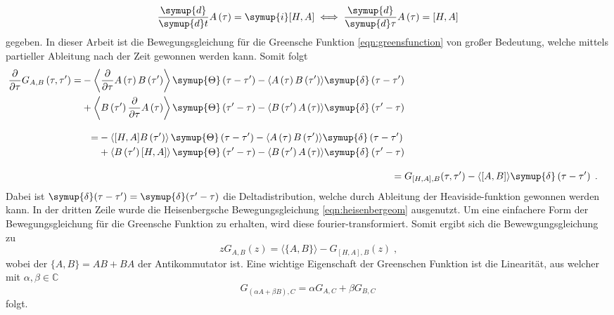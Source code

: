 \begin{equation}
\frac{\symup{d}}{\symup{d}t} A \left (\tau \right ) = \symup{i}  [H, A] \iff \frac{\symup{d}}{\symup{d}\tau} A \left (\tau \right ) = [H, A] \label{eqn:heisenbergeom}
\end{equation}
gegeben.
In dieser Arbeit ist die Bewegungsgleichung für die Greensche Funktion \eqref{eqn:greensfunction} von großer Bedeutung, welche mittels 
partieller Ableitung nach der Zeit gewonnen werden kann.\cite{greensfunction}
Somit folgt
\begin{align*}
    \begin{split}
    \frac{\partial}{\partial \tau} G_{A,B} \left (\tau, \tau' \right) = 
    &- \left \langle \frac{\partial}{\partial \tau}A \left (\tau \right ) B \left ( \tau' \right ) \right \rangle
    \symup{\Theta} \left ( \tau - \tau' \right) -  \langle A \left (\tau \right ) B \left ( \tau' \right ) \rangle \symup{\delta} \left ( \tau - \tau' \right)\\
    &+ \left \langle B \left ( \tau' \right ) \frac{\partial}{\partial \tau}A \left (\tau \right ) \right \rangle \symup{\Theta} \left ( \tau' - \tau \right)
    -  \langle B \left ( \tau' \right ) A \left (\tau \right ) \rangle \symup{\delta} \left ( \tau' - \tau \right)
    \end{split}
    \\[2ex]
    \begin{split}
    = &- \left \langle [H,A] B \left ( \tau' \right ) \right \rangle
    \symup{\Theta} \left ( \tau - \tau' \right) -  \langle A \left (\tau \right ) B \left ( \tau' \right ) \rangle \symup{\delta} \left ( \tau - \tau' \right)\\
    &+ \left \langle B \left ( \tau' \right ) [H,A] \right \rangle \symup{\Theta} \left ( \tau' - \tau \right)
    -  \langle B \left ( \tau' \right ) A \left (\tau \right ) \rangle \symup{\delta} \left ( \tau' - \tau \right)
    \end{split}
    \\[2ex]
    =\; & G_{[H,A],B}(\tau, \tau') - \langle [A,B] \rangle \symup{\delta} \left ( \tau - \tau' \right) \; \text{.}
\end{align*} 
Dabei ist  $\symup{\delta} (\tau-\tau') = \symup{\delta} (\tau'-\tau) $ die Deltadistribution, welche durch Ableitung der Heaviside-funktion gewonnen werden kann.
In der dritten Zeile wurde die Heisenbergsche Bewegungsgleichung \eqref{eqn:heisenbergeom} ausgenutzt.
Um eine einfachere Form der Bewegungsgleichung für die Greensche Funktion zu erhalten, wird diese fourier-transformiert.
Somit ergibt sich die Bewewgungsgleichung zu 
\begin{equation}
    zG_{A,B}(z) = \langle \{A,B\} \rangle - G_{[H,A],B}(z) \; \text{,} \label{eqn:fouriereom}
\end{equation} 
wobei der $\{ A,B \} = AB+BA$ der Antikommutator ist.\cite{greensfunction}
Eine wichtige Eigenschaft der Greenschen Funktion ist die Linearität, aus welcher mit $\alpha, \beta \in \mathbb{C}$
\begin{equation*}
    G_{(\alpha A + \beta B), C} = \alpha G_{A,C} + \beta G_{B,C}
\end{equation*}
folgt.

